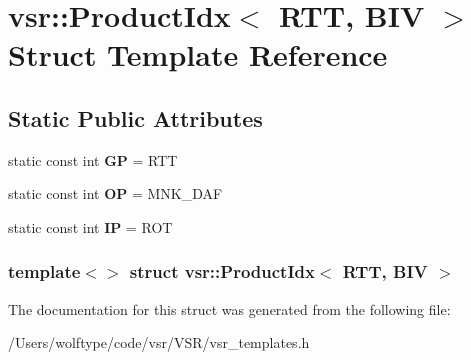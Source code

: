 \hypertarget{structvsr_1_1_product_idx_3_01_r_t_t_00_01_b_i_v_01_4}{\section{vsr\-:\-:Product\-Idx$<$ R\-T\-T, B\-I\-V $>$ Struct Template Reference}
\label{structvsr_1_1_product_idx_3_01_r_t_t_00_01_b_i_v_01_4}
}
\subsection*{Static Public Attributes}
\begin{DoxyCompactItemize}
\item 
\hypertarget{structvsr_1_1_product_idx_3_01_r_t_t_00_01_b_i_v_01_4_a49a9b0b8888a19b86621e0c9f0ff4f4e}{static const int {\bfseries G\-P} = R\-T\-T}\label{structvsr_1_1_product_idx_3_01_r_t_t_00_01_b_i_v_01_4_a49a9b0b8888a19b86621e0c9f0ff4f4e}

\item 
\hypertarget{structvsr_1_1_product_idx_3_01_r_t_t_00_01_b_i_v_01_4_ad3149d7b35d4b6ab43d60980f88a3302}{static const int {\bfseries O\-P} = M\-N\-K\-\_\-\-D\-A\-F}\label{structvsr_1_1_product_idx_3_01_r_t_t_00_01_b_i_v_01_4_ad3149d7b35d4b6ab43d60980f88a3302}

\item 
\hypertarget{structvsr_1_1_product_idx_3_01_r_t_t_00_01_b_i_v_01_4_ade5d8144d5b010d63a586c5e23a41479}{static const int {\bfseries I\-P} = R\-O\-T}\label{structvsr_1_1_product_idx_3_01_r_t_t_00_01_b_i_v_01_4_ade5d8144d5b010d63a586c5e23a41479}

\end{DoxyCompactItemize}
\subsubsection*{template$<$$>$ struct vsr\-::\-Product\-Idx$<$ R\-T\-T, B\-I\-V $>$}



The documentation for this struct was generated from the following file\-:\begin{DoxyCompactItemize}
\item 
/\-Users/wolftype/code/vsr/\-V\-S\-R/vsr\-\_\-templates.\-h\end{DoxyCompactItemize}
